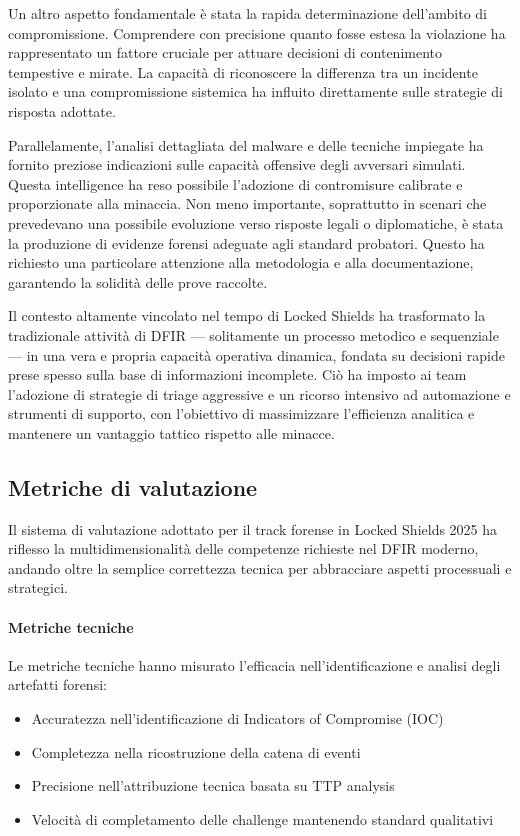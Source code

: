 Un altro aspetto fondamentale è stata la rapida determinazione dell’ambito di compromissione. Comprendere con precisione quanto fosse estesa la violazione ha rappresentato un fattore cruciale per attuare decisioni di contenimento tempestive e mirate. La capacità di riconoscere la differenza tra un incidente isolato e una compromissione sistemica ha influito direttamente sulle strategie di risposta adottate.

Parallelamente, l’analisi dettagliata del malware e delle tecniche impiegate ha fornito preziose indicazioni sulle capacità offensive degli avversari simulati. Questa intelligence ha reso possibile l’adozione di contromisure calibrate e proporzionate alla minaccia. Non meno importante, soprattutto in scenari che prevedevano una possibile evoluzione verso risposte legali o diplomatiche, è stata la produzione di evidenze forensi adeguate agli standard probatori. Questo ha richiesto una particolare attenzione alla metodologia e alla documentazione, garantendo la solidità delle prove raccolte.

Il contesto altamente vincolato nel tempo di Locked Shields ha trasformato la tradizionale attività di DFIR — solitamente un processo metodico e sequenziale — in una vera e propria capacità operativa dinamica, fondata su decisioni rapide prese spesso sulla base di informazioni incomplete. Ciò ha imposto ai team l’adozione di strategie di triage aggressive e un ricorso intensivo ad automazione e strumenti di supporto, con l’obiettivo di massimizzare l’efficienza analitica e mantenere un vantaggio tattico rispetto alle minacce.

\subsection{Metriche di valutazione}

Il sistema di valutazione adottato per il track forense in Locked Shields 2025 ha riflesso la multidimensionalità delle competenze richieste nel DFIR moderno, andando oltre la semplice correttezza tecnica per abbracciare aspetti processuali e strategici.

\paragraph{Metriche tecniche}
Le metriche tecniche hanno misurato l'efficacia nell'identificazione e analisi degli artefatti forensi:
\begin{itemize}
    \item Accuratezza nell'identificazione di Indicators of Compromise (IOC)
    \item Completezza nella ricostruzione della catena di eventi
    \item Precisione nell'attribuzione tecnica basata su TTP analysis
    \item Velocità di completamento delle challenge mantenendo standard qualitativi
\end{itemize}

